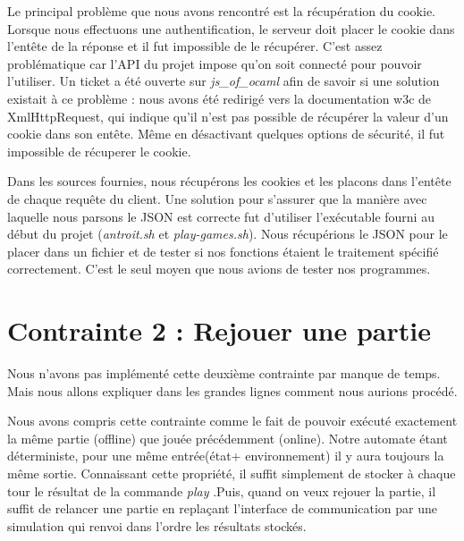 \documentclass[12pt,a4paper]{report}
\begin{document}
Le principal problème que nous avons rencontré est la récupération du cookie.
Lorsque nous effectuons une authentification, le serveur doit placer le cookie
dans l'entête de la réponse et il fut impossible de le récupérer. C'est assez
problématique car l'API du projet impose qu'on soit connecté pour pouvoir
l'utiliser. Un ticket a été ouverte sur \emph{js\_of\_ocaml} afin de savoir
si une solution existait à ce problème : nous avons été redirigé vers la
documentation w3c de XmlHttpRequest, qui indique qu'il n'est pas possible de
récupérer la valeur d'un cookie dans son entête. Même en désactivant
quelques options de sécurité, il fut impossible de récuperer le cookie. \newline

Dans les sources fournies, nous récupérons les cookies et les placons dans
l'entête de chaque requête du client. Une solution pour s'assurer que la manière
avec laquelle nous parsons le JSON est correcte fut d'utiliser l'exécutable
fourni au début du projet (\emph{antroit.sh} et \emph{play-games.sh}). Nous
récupérions le JSON pour le placer dans un fichier et de tester si nos
fonctions étaient le traitement spécifié correctement. C'est le seul moyen que
nous avions de tester nos programmes.

\section{Contrainte 2 : Rejouer une partie}
Nous n'avons pas implémenté cette deuxième contrainte par manque de temps.
Mais nous allons expliquer dans les grandes lignes comment nous aurions procédé.

Nous avons compris cette contrainte comme le fait de pouvoir exécuté exactement la même partie (offline) que jouée précédemment (online).
Notre automate étant déterministe, pour une même entrée(état+ environnement) il y aura toujours la même sortie. Connaissant cette propriété, il suffit simplement de stocker à chaque tour le résultat de la commande  \emph{play} .Puis, quand on veux rejouer la partie, il suffit de relancer une partie en replaçant l'interface de communication par une simulation qui renvoi dans l'ordre les résultats stockés.
\end{document}
